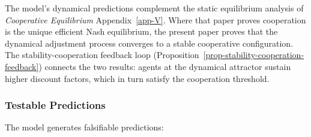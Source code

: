 \documentclass[11pt]{article}
\theoremstyle{plain}
\theoremstyle{definition}
\theoremstyle{remark}
\let\origsubsubsection\subsubsection
\renewcommand{\subsubsection}{\needspace{4\baselineskip}\origsubsubsection}
\begin{document}
The model's dynamical predictions complement the static equilibrium
analysis of \emph{Cooperative Equilibrium} Appendix~\ref{app-V}. Where
that paper proves cooperation is the unique efficient Nash equilibrium,
the present paper proves that the dynamical adjustment process converges
to a stable cooperative configuration. The stability-cooperation
feedback loop (Proposition~\ref{prop-stability-cooperation-feedback})
connects the two results: agents at the dynamical attractor sustain
higher discount factors, which in turn satisfy the cooperation
threshold.

\subsubsection{Testable Predictions}\label{testable-predictions-5}

The model generates falsifiable predictions:
\end{document}
